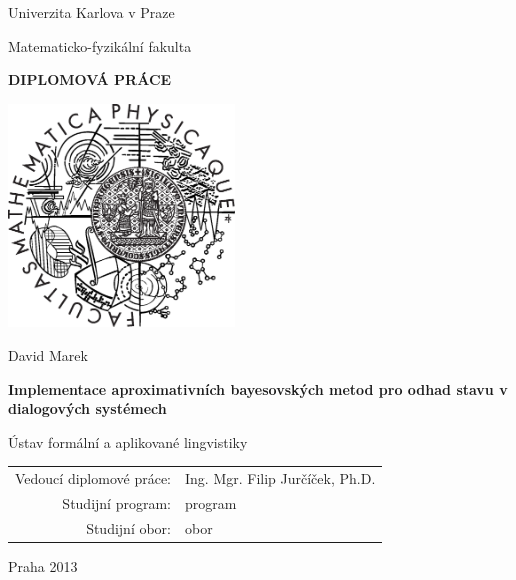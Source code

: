 \documentclass[12pt,a4paper]{report}
\begin{document}



\pagestyle{empty}
\begin{center}

\large

Univerzita Karlova v Praze

\medskip

Matematicko-fyzikální fakulta

\vfill

{\bf\Large DIPLOMOVÁ PRÁCE}

\vfill

\centerline{\mbox{\includegraphics[width=60mm]{../img/logo.eps}}}

\vfill
\vspace{5mm}

{\LARGE David Marek}

\vspace{15mm}

{\LARGE\bfseries Implementace aproximativních bayesovských metod pro odhad stavu v dialogových systémech}

\vfill

Ústav formální a aplikované lingvistiky

\vfill

\begin{tabular}{rl}

Vedoucí diplomové práce: & Ing. Mgr. Filip Jurčíček, Ph.D. \\
\noalign{\vspace{2mm}}
Studijní program: & program \\
\noalign{\vspace{2mm}}
Studijní obor: & obor \\
\end{tabular}

\vfill

Praha 2013

\end{center}
\end{document}
